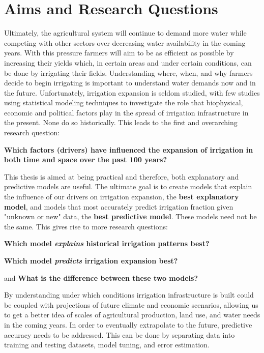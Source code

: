 \documentclass[12pt]{extarticle}
\begin{document}
\section{Aims and Research Questions}

Ultimately, the agricultural system will continue to demand more water while competing with other sectors over decreasing water availability in the coming years. With this pressure farmers will aim to be as efficient as possible by increasing their yields which, in certain areas and under certain conditions, can be done by irrigating their fields. Understanding where, when, and why farmers decide to begin irrigating is important to understand water demands now and in the future. Unfortunately, irrigation expansion is seldom studied, with few studies using statistical modeling techniques to investigate the role that biophysical, economic and political factors play in the spread of irrigation infrastructure in the present. None do so historically. This leads to the first and overarching research question:


\begin{center}
\textbf{Which factors (drivers) have influenced the expansion of irrigation in both time and space over the past 100 years? }

\end{center}
This thesis is aimed at being practical and therefore, both explanatory and predictive models are useful. The ultimate goal is to create models that explain the influence of our drivers on irrigation expansion, the \textbf{best explanatory model}, and models that most accurately predict irrigation fraction given "unknown or new" data, the \textbf{best predictive model}.  These models need not be the same. This gives rise to more research questions:

\begin{center}
\textbf{Which model \emph{explains} historical irrigation patterns best?}

\textbf{Which model \emph{predicts} irrigation expansion best?}

and 
\textbf{What is the difference between these two models?}
\end{center}

By understanding under which conditions irrigation infrastructure is built could be coupled with projections of future climate and economic scenarios, allowing us to get a better idea of scales of agricultural production, land use, and water needs in the coming years. In order to eventually extrapolate to the future, predictive accuracy needs to be addressed. This can be done by separating data into training and testing datasets, model tuning, and error estimation. 
\end{document}

